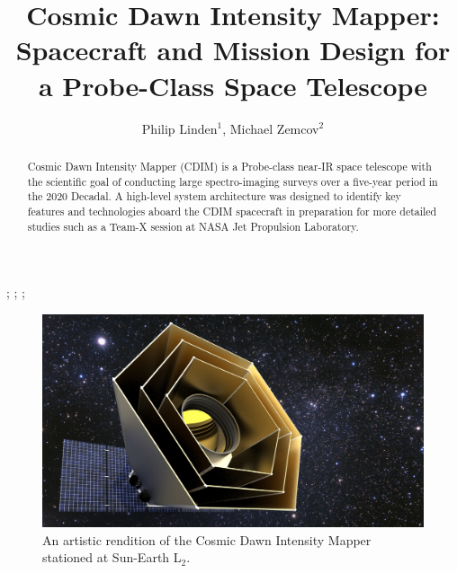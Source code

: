 \documentclass{ws-jai}
\begin{document}
\catchline{}{}{}{}{} %


\title{Cosmic Dawn Intensity Mapper: \\Spacecraft and Mission Design for a Probe-Class Space Telescope}

\author{Philip Linden$^{1}$, Michael Zemcov$^{2}$}

\address{
$^{1}$Department of Mechanical Engineering, Kate Gleason College of Engineering, Rochester
Institute of Technology, Rochester, NY 14623, USA, pjl7651@rit.edu\\
$^{2}$Center for Detectors, School of Physics and Astronomy, Rochester
Institute of Technology, Rochester, NY 14623, USA, zemcov@cfd.rit.edu
}

\maketitle


\begin{history}
;
;
;
\end{history}

\begin{abstract}
  Cosmic Dawn Intensity Mapper (CDIM) is a Probe-class near-IR space telescope with the scientific goal of conducting large spectro-imaging surveys over a five-year period in the 2020 Decadal.
  A high-level system architecture was designed to identify key features and technologies aboard the CDIM spacecraft in preparation for more detailed studies such as a Team-X session at NASA Jet Propulsion Laboratory.
\end{abstract}


\begin{figure}
  \includegraphics[width=\linewidth]{figs/cdim_cover-render.jpg}
  \caption{An artistic rendition of the Cosmic Dawn Intensity Mapper stationed at Sun-Earth L$_2$.}
\label{fig:cover}
\end{figure}
\twocolumn
\end{document}
